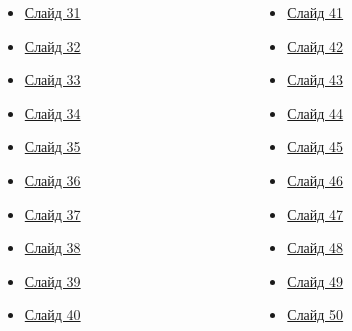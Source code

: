 \begin{frame}[label=tableslide,noframenumbering,plain]
\begin{columns}[T]
	\begin{column}{0.2\textwidth} %
		\begin{itemize}
			\item \hyperlink{slide31}{Слайд 31} %
			\item \hyperlink{slide32}{Слайд 32} %
			\item \hyperlink{slide33}{Слайд 33} %
			\item \hyperlink{slide34}{Слайд 34} %
			\item \hyperlink{slide35}{Слайд 35} %
			\item \hyperlink{slide36}{Слайд 36} %
			\item \hyperlink{slide37}{Слайд 37} %
			\item \hyperlink{slide38}{Слайд 38} %
			\item \hyperlink{slide39}{Слайд 39} %
			\item \hyperlink{slide40}{Слайд 40} %
		\end{itemize}
	\end{column}
	\begin{column}{0.2\textwidth} %
		\begin{itemize}
			\item \hyperlink{slide31}{Слайд 41} %
			\item \hyperlink{slide32}{Слайд 42} %
			\item \hyperlink{slide33}{Слайд 43} %
			\item \hyperlink{slide34}{Слайд 44} %
			\item \hyperlink{slide35}{Слайд 45} %
			\item \hyperlink{slide36}{Слайд 46} %
			\item \hyperlink{slide37}{Слайд 47} %
			\item \hyperlink{slide38}{Слайд 48} %
			\item \hyperlink{slide39}{Слайд 49} %
			\item \hyperlink{slide40}{Слайд 50} %
		\end{itemize}
	\end{column}
\end{columns}
\end{frame}